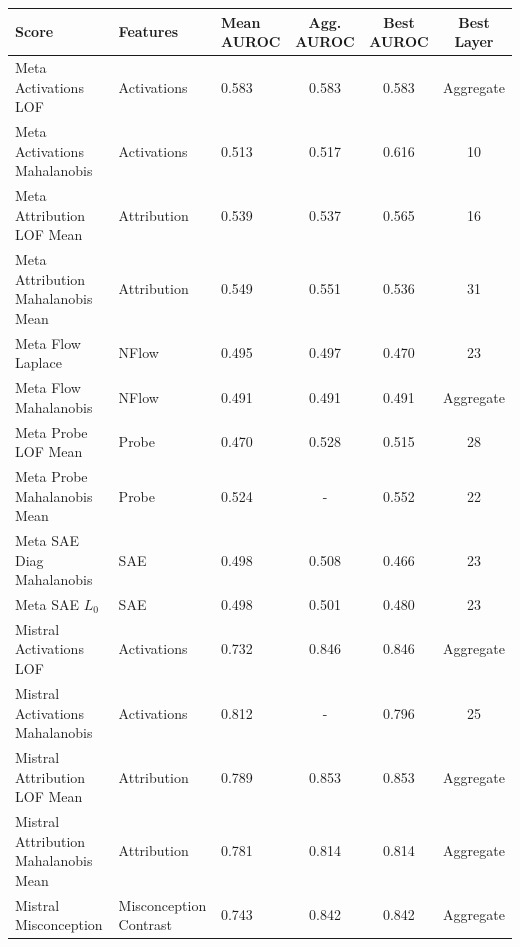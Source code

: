 \begin{table}[H]
\centering
\scriptsize  %
\renewcommand{\arraystretch}{1.2}  %
\setlength{\tabcolsep}{2pt}  %
\begin{tabular}{lp{3cm}lccc}
\toprule
\textbf{Score} & \textbf{Features} & \textbf{Mean AUROC} & \textbf{Agg. AUROC} & \textbf{Best AUROC} & \textbf{Best Layer} \\
\midrule
Meta Activations LOF                 & Activations            & 0.583  & 0.583  & 0.583  & Aggregate \\ 
Meta Activations Mahalanobis         & Activations            & 0.513  & 0.517  & 0.616  & 10 \\ 
Meta Attribution LOF Mean            & Attribution            & 0.539  & 0.537  & 0.565  & 16 \\ 
Meta Attribution Mahalanobis Mean    & Attribution            & 0.549  & 0.551  & 0.536  & 31 \\ 
Meta Flow Laplace                    & NFlow                  & 0.495  & 0.497  & 0.470  & 23 \\ 
Meta Flow Mahalanobis                & NFlow                  & 0.491  & 0.491  & 0.491  & Aggregate \\ 
Meta Probe LOF Mean                  & Probe                  & 0.470  & 0.528  & 0.515  & 28 \\ 
Meta Probe Mahalanobis Mean          & Probe                  & 0.524  & -      & 0.552  & 22 \\ 
Meta SAE Diag Mahalanobis            & SAE                    & 0.498  & 0.508  & 0.466  & 23 \\ 
Meta SAE $L_0$                          & SAE                    & 0.498  & 0.501  & 0.480  & 23 \\ 
Mistral Activations LOF              & Activations            & 0.732  & 0.846  & 0.846  & Aggregate \\ 
Mistral Activations Mahalanobis      & Activations            & 0.812  & -      & 0.796  & 25 \\ 
Mistral Attribution LOF Mean         & Attribution            & 0.789  & 0.853  & 0.853  & Aggregate \\ 
Mistral Attribution Mahalanobis Mean & Attribution            & 0.781  & 0.814  & 0.814  & Aggregate \\ 
Mistral Misconception                & Misconception Contrast & 0.743  & 0.842  & 0.842  & Aggregate \\ 

\end{tabular}
\end{table}
